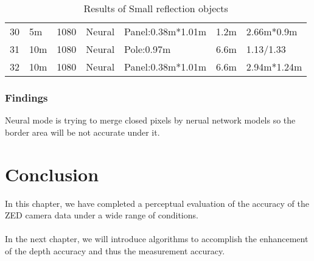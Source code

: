 \begin{table}[]
\begin{tabular}{lllllll}
  30  & 5m                                                & 1080                                                   & Neural                                           & Panel:0.38m*1.01m                                        & 1.2m                                                          & 2.66m*0.9m                                                            \\
  31  & 10m                                               & 1080                                                   & Neural                                           & Pole:0.97m                                               & 6.6m                                                          & 1.13/1.33                                                             \\
  32  & 10m                                               & 1080                                                   & Neural                                           & Panel:0.38m*1.01m                                        & 6.6m                                                          & 2.94m*1.24m                                                          
  \end{tabular}
\caption{Results of Small reflection objects}
\label{fig:small}
\end{table}
\subsubsection{Findings}

Neural mode is trying to merge closed pixels by nerual network models so the border area will be not accurate under it. 

\section*{Conclusion}

In this chapter, we have completed a perceptual evaluation of the accuracy of the ZED camera data under a wide range of conditions.

\paragraph*{}

In the next chapter, we will introduce algorithms to accomplish the enhancement of the depth accuracy and thus the measurement accuracy.

